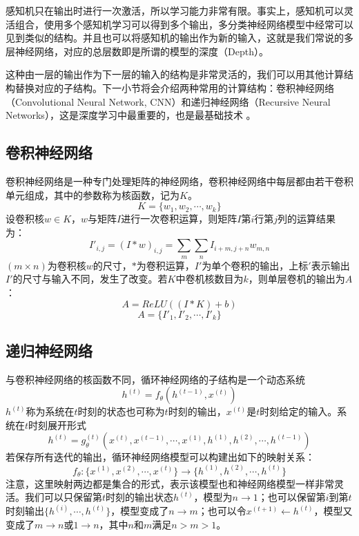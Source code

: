\documentclass[a4paper, tikz]{article}
\begin{document}
感知机只在输出时进行一次激活，所以学习能力非常有限。事实上，感知机可以灵活组合，使用多个感知机学习可以得到多个输出，多分类神经网络模型中经常可以见到类似的结构。并且也可以将感知机的输出作为新的输入，这就是我们常说的多层神经网络，对应的总层数即是所谓的模型的深度（Depth）。

这种由一层的输出作为下一层的输入的结构是非常灵活的，我们可以用其他计算结构替换对应的子结构。下一小节将会介绍两种常用的计算结构：卷积神经网络（Convolutional Neural Network, CNN）和递归神经网络（Recursive Neural Networks），这是深度学习中最重要的，也是最基础技术\citep{liu2017protein}\citep{guo2018protein} 。

\subsection{卷积神经网络}
卷积神经网络是一种专门处理矩阵的神经网络，卷积神经网络中每层都由若干卷积单元组成，其中的参数称为核函数，记为$K$。
\begin{equation}
	K = \{w_1,w_2,\cdots,w_k\}
\end{equation}
设卷积核$w\in K$，$w$与矩阵$I$进行一次卷积运算，则矩阵$I$第$i$行第$j$列的运算结果为：
\begin{equation}
	I'_{i,j}= (I*w)_{i,j}=\sum_{m}\sum_{n}I_{i+m,j+n}w_{m,n}
\end{equation}
$(m\times n)$为卷积核$w$的尺寸，$*$为卷积运算，$I'$为单个卷积的输出，上标$'$表示输出$I'$的尺寸与输入不同，发生了改变。若$K$中卷机核数目为$k$，则单层卷机的输出为$A$：
\begin{equation}
	A = ReLU((I*K)+b)
\end{equation}
\begin{equation}
	A = \{I'_1,I'_2,\cdots,I'_k\}
\end{equation}

\subsection{递归神经网络}%
与卷积神经网络的核函数不同，循环神经网络的子结构是一个动态系统
\begin{equation}
	h^{(t)} = f_{\theta}(h^{(t-1)},x^{(t)})
\end{equation}
$h^{(t)}$称为系统在$t$时刻的状态也可称为$t$时刻的输出，$x^{(t)}$是$t$时刻给定的输入。系统在$t$时刻展开形式
\begin{equation}
	h^{(t)} = g_{\theta}^{(t)}(x^{(t)},x^{(t-1)},\cdots,x^{(1)},h^{(1)},h^{(2)},\cdots,h^{(t-1)})
\end{equation}
若保存所有迭代的输出，循环神经网络模型可以构建出如下的映射关系：
\begin{equation}
	f_{\theta}:\{x^{(1)},x^{(2)},\cdots,x^{(t)}\}\to \{h^{(1)},h^{(2)},\cdots,h^{(t)}\}
\end{equation}
注意，这里映射两边都是集合的形式，表示该模型也和神经网络模型一样非常灵活。我们可以只保留第$t$时刻的输出状态$h^{(t)}$，模型为$n\to1$；也可以保留第$i$到第$t$时刻输出$\{h^{(i)},\cdots,h^{(t)}\}$，模型变成了$n\to m$；也可以令$x^{(t+1)}\gets h^{(t)}$，模型又变成了$m\to n$或$1\to n$，其中$n$和$m$满足$n>m>1$。
\end{document}
